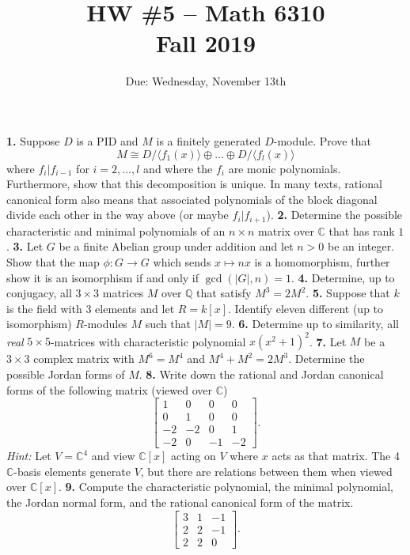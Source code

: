 \documentclass[11pt]{amsart}
\renewcommand{\to}[1][]{\xrightarrow{\ #1\ }}
\newcommand{\bQ}{\mathbb{Q}}
\newcommand{\bC}{\mathbb{C}}
\begin{document}
\title{HW \#5 -- Math 6310\\Fall 2019}
\author{Due: Wednesday, November 13th}
\maketitle
\noindent
{\bf 1.}  Suppose $D$ is a PID and $M$ is a finitely generated $D$-module.  Prove that 
\[
    M \cong D/\langle f_1(x) \rangle \oplus \dots \oplus D/\langle f_l(x) \rangle
\]
where $f_i | f_{i-1}$ for $i = 2, \dots, l$ and where the $f_i$ are monic polynomials.  Furthermore, show that this decomposition is unique.
\vfill
In many texts, rational canonical form also means that associated polynomials of the block diagonal divide each other in the way above (or maybe $f_i | f_{i+1}$).
\newpage
\noindent
{\bf 2.}  Determine the possible characteristic and minimal polynomials of an $n\times n$ matrix over $\bC$ that has rank $1$.
\newpage
\noindent
{\bf 3.}  Let $G$ be a finite Abelian group under addition and let $n > 0$ be an integer.  Show that the map $\phi : G \to G$ which sends $x \mapsto n x$ is a homomorphism, further show it is an isomorphism if and only if $\gcd(|G|, n) = 1$.
\newpage
\noindent
{\bf 4.}  Determine, up to conjugacy, all $3\times 3$ matrices $M$ over $\bQ$ that satisfy $M^3=2M^2$.
\newpage
\noindent
{\bf 5.}  Suppose that $k$ is the field with 3 elements and let $R = k[x]$.  Identify eleven different (up to isomorphism) $R$-modules $M$ such that $|M| = 9$. 
\newpage
\noindent
{\bf 6.}  Determine up to similarity, all \emph{real} $5 \times 5$-matrices with characteristic polynomial $x(x^2+1)^2$.  
\newpage
\noindent
{\bf 7.}  Let $M$ be a $3 \times 3$ complex matrix with $M^6=M^4$ and $M^4+M^2=2M^3$. Determine the possible Jordan forms of $M$.
\newpage
\noindent
{\bf 8.}  Write down the rational and Jordan canonical forms of the following matrix (viewed over $\bC$)
\[
    \left[
        \begin{array}{cccc}
            1 & 0 & 0 & 0\\
            0 & 1 & 0 & 0\\
            -2 & -2 & 0 & 1\\
            -2 & 0 & -1 & -2
        \end{array}
    \right].
\]
\emph{Hint:}  Let $V = \bC^4$ and view $\bC[x]$ acting on $V$ where $x$ acts as that matrix.  The 4 $\bC$-basis elements generate $V$, but there are relations between them when viewed over $\bC[x]$.
\newpage
\noindent
{\bf 9.}  Compute the characteristic polynomial, the minimal polynomial, the Jordan normal form, and the rational canonical form of the matrix.
\[
    \left[
        \begin{array}{ccc}
            3 & 1 & -1 \\
            2 & 2 & -1 \\
            2 & 2 & 0
        \end{array}
    \right].
\]
\end{document}
